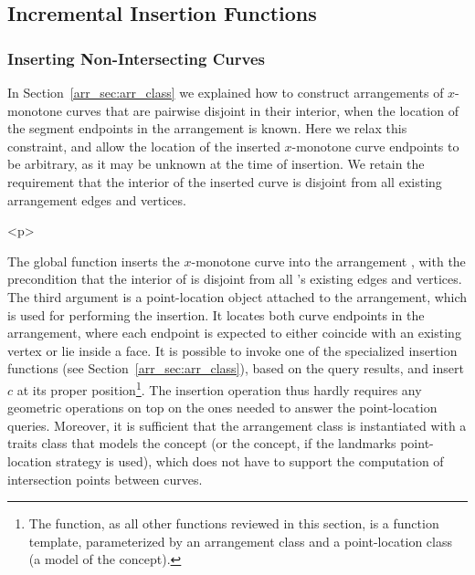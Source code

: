 \subsection{Incremental Insertion Functions}
\label{arr_ssec:inc_insert}
%
\subsubsection{Inserting Non-Intersecting Curves}
\label{arr_sssec:insert_non_x}
%
In Section~\ref{arr_sec:arr_class} we explained how to construct
arrangements of $x$-monotone curves that are pairwise disjoint in
their interior, when the location of the segment endpoints in the
arrangement is known. Here we relax this constraint, and allow the
location of the inserted $x$-monotone curve endpoints to be arbitrary,
as it may be unknown at the time of insertion. We retain the
requirement that the interior of the inserted curve is disjoint from
all existing arrangement edges and vertices.

\begin{ccHtmlOnly}<p>\end{ccHtmlOnly}
The global function 
inserts the $x$-monotone curve  into the arrangement ,
with the precondition that the interior of  is disjoint from
all 's existing edges and vertices. The third argument
 is a point-location object attached to the arrangement,
which is used for performing the insertion. It locates both curve
endpoints in the arrangement, where each endpoint is expected to
either coincide with an existing vertex or lie inside a face.
It is possible to invoke one of the specialized insertion functions
(see Section~\ref{arr_sec:arr_class}), based on the query results, and
insert $c$ at its proper position\footnote{The
 function, as all other functions
reviewed in this section, is a function template, parameterized by an
arrangement class and a point-location class (a model of the
 concept).}. The insertion operation
thus hardly requires any geometric operations on top on the ones
needed to answer the point-location queries. Moreover, it is
sufficient that the arrangement class is instantiated with a
traits class that models the 
concept (or the  concept, if the
landmarks point-location strategy is used), which does not have to
support the computation of intersection points between curves.

